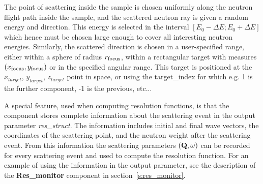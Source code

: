 The point of scattering inside the sample is chosen uniformly
along the neutron flight path inside the sample, and the scattered
neutron ray is given a random energy and direction. This energy is selected in
the interval $[E_0-\Delta E; E_0+\Delta E]$ which hence must be
chosen large enough to cover all interesting neutron energies.
Similarly, the scattered
direction is chosen in a user-specified range,
either within a sphere of radius $r_{\rm focus}$, within a rectangular
target with measures $(x_{\rm focus}, y_{\rm focus})$
or in the specified angular range. This target is positioned at the $x_{target}$, $y_{target}$, $z_{target}$ point in space, or using the target\_index for which e.g. 1 is the further component, -1 is the previous, etc...

A special feature, used when computing resolution functions, is that the
component stores complete information about the scattering event in the
output parameter \textit{res\_struct}. The information includes initial
and final wave vectors, the coordinates of the scattering point, and the
neutron weight after the scattering event. From this information the
scattering parameters $({\bf Q}, \omega)$ can be recorded
for every scattering event and used to compute the resolution function.
For an example of using the
information in the output parameter, see the description of the
\textbf{Res\_monitor} component in section~\ref{s:res_monitor}.

